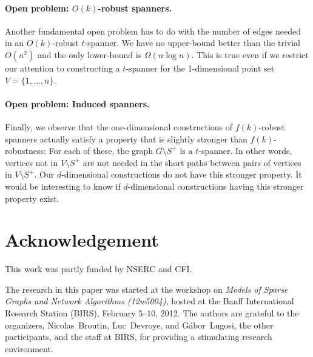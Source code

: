 \documentclass{patmorin}
\begin{document}
\paragraph{Open problem: $O(k)$-robust spanners.}

Another fundamental open problem has to do with the number of edges needed
in an $O(k)$-robust $t$-spanner.  We have no upper-bound better than the
trivial $O(n^2)$ and the only lower-bound is $\Omega(n\log n)$.  This is
true even if we restrict our attention to constructing a $t$-spanner
for the 1-dimensional point set $V=\{1,\ldots,n\}$.

\paragraph{Open problem: Induced spanners.}

Finally, we observe that the one-dimensional constructions of
$f(k)$-robust spanners actually satisfy a property that is slightly
stronger than $f(k)$-robustness:  For each of these, the graph $G\setminus
S^+$ is a $t$-spanner.  In other words, vertices not in $V\setminus
S^+$ are not needed in the short paths between pairs of vertices in
$V\setminus S^+$.  Our $d$-dimensional constructions do not have this
stronger property.  It would be interesting to know if $d$-dimensional
constructions having this stronger property exist.

\section*{Acknowledgement}

This work was partly funded by NSERC and CFI.

The research in this paper was started at the workshop on \emph{Models
of Sparse Graphs and Network Algorithms (12w5004)}, hosted at the
Banff International Research Station (BIRS), February 5--10, 2012.
The authors are grateful to the organizers, \mbox{Nicolas~Broutin},
\mbox{Luc~Devroye}, and \mbox{G\'abor~Lugosi}, the other participants, and the staff
at BIRS, for providing a stimulating research environment.



\end{document}
